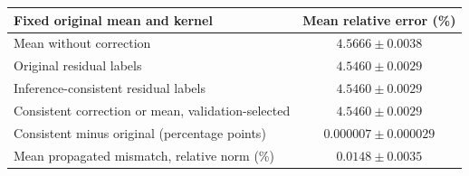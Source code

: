 \begin{tabular}{lc}
\toprule
Fixed original mean and kernel & Mean relative error (\%) \\
\midrule
Mean without correction & $4.5666\pm0.0038$ \\
Original residual labels & $4.5460\pm0.0029$ \\
Inference-consistent residual labels & $4.5460\pm0.0029$ \\
Consistent correction or mean, validation-selected & $4.5460\pm0.0029$ \\
\midrule
Consistent minus original (percentage points) & $0.000007\pm0.000029$ \\
Mean propagated mismatch, relative norm (\%) & $0.0148\pm0.0035$ \\
\bottomrule
\end{tabular}
